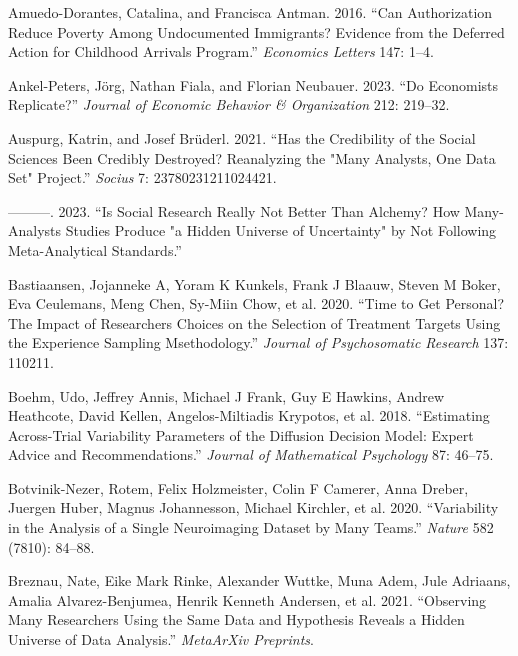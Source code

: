 \documentclass[
  letterpaper,
  DIV=11,
  numbers=noendperiod]{scrartcl}
\newlength{\cslhangindent}
\newlength{\cslentryspacingunit} %
\newenvironment{CSLReferences}[2] %
 {%
  \setlength{\parindent}{0pt}
  \ifodd #1
  \let\oldpar\par
  \def\par{\hangindent=\cslhangindent\oldpar}
  \fi
  \setlength{\parskip}{#2\cslentryspacingunit}
 }%
 {}
\begin{document}
\hypertarget{refs}{}
\begin{CSLReferences}{1}{0}
\leavevmode{}%
Amuedo-Dorantes, Catalina, and Francisca Antman. 2016. {``Can
Authorization Reduce Poverty Among Undocumented Immigrants? Evidence
from the Deferred Action for Childhood Arrivals Program.''}
\emph{Economics Letters} 147: 1--4.

\leavevmode{}%
Ankel-Peters, Jörg, Nathan Fiala, and Florian Neubauer. 2023. {``Do
Economists Replicate?''} \emph{Journal of Economic Behavior \&
Organization} 212: 219--32.

\leavevmode{}%
Auspurg, Katrin, and Josef Brüderl. 2021. {``Has the Credibility of the
Social Sciences Been Credibly Destroyed? Reanalyzing the "Many Analysts,
One Data Set" Project.''} \emph{Socius} 7: 23780231211024421.

\leavevmode{}%
---------. 2023. {``Is Social Research Really Not Better Than Alchemy?
How Many-Analysts Studies Produce "a Hidden Universe of Uncertainty" by
Not Following Meta-Analytical Standards.''}

\leavevmode{}%
Bastiaansen, Jojanneke A, Yoram K Kunkels, Frank J Blaauw, Steven M
Boker, Eva Ceulemans, Meng Chen, Sy-Miin Chow, et al. 2020. {``Time to
Get Personal? The Impact of Researchers Choices on the Selection of
Treatment Targets Using the Experience Sampling Msethodology.''}
\emph{Journal of Psychosomatic Research} 137: 110211.

\leavevmode{}%
Boehm, Udo, Jeffrey Annis, Michael J Frank, Guy E Hawkins, Andrew
Heathcote, David Kellen, Angelos-Miltiadis Krypotos, et al. 2018.
{``Estimating Across-Trial Variability Parameters of the Diffusion
Decision Model: Expert Advice and Recommendations.''} \emph{Journal of
Mathematical Psychology} 87: 46--75.

\leavevmode{}%
Botvinik-Nezer, Rotem, Felix Holzmeister, Colin F Camerer, Anna Dreber,
Juergen Huber, Magnus Johannesson, Michael Kirchler, et al. 2020.
{``Variability in the Analysis of a Single Neuroimaging Dataset by Many
Teams.''} \emph{Nature} 582 (7810): 84--88.

\leavevmode{}%
Breznau, Nate, Eike Mark Rinke, Alexander Wuttke, Muna Adem, Jule
Adriaans, Amalia Alvarez-Benjumea, Henrik Kenneth Andersen, et al. 2021.
{``Observing Many Researchers Using the Same Data and Hypothesis Reveals
a Hidden Universe of Data Analysis.''} \emph{MetaArXiv Preprints}.


\end{CSLReferences}
\end{document}
